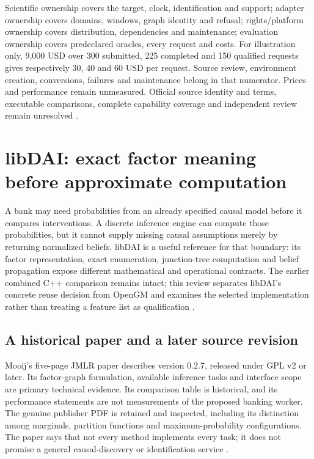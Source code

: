 Scientific ownership covers the target, clock, identification and support;
adapter ownership covers domains, windows, graph identity and refusal;
rights/platform ownership covers distribution, dependencies and maintenance;
evaluation ownership covers predeclared oracles, every request and costs.
For illustration only, 9,000 USD over 300 submitted, 225 completed and
150 qualified requests gives respectively 30, 40 and 60 USD per request.
Source review, environment creation, conversions, failures and maintenance
belong in that numerator. Prices and performance remain unmeasured.
Official source identity and terms, executable comparisons, complete capability coverage and independent review remain unresolved
\cite{exec24_banjo_choice}.


\section{libDAI: exact factor meaning before approximate computation}
\label{sec:exec24-libdai-reuse}

A bank may need probabilities from an already specified causal model before
it compares interventions. A discrete inference engine can compute those
probabilities, but it cannot supply missing causal assumptions merely by
returning normalized beliefs. libDAI is a useful reference for that boundary:
its factor representation, exact enumeration, junction-tree computation and
belief propagation expose different mathematical and operational contracts.
The earlier combined C++ comparison remains intact; this review separates
libDAI's concrete reuse decision from OpenGM and examines the selected
implementation rather than treating a feature list as qualification
\cite{exec13_cxx_inference,exec24_libdai_source}.

\subsection{A historical paper and a later source revision}
Mooij's five-page JMLR paper describes version 0.2.7, released under GPL v2 or
later. Its factor-graph formulation, available inference tasks and interface
scope are primary technical evidence. Its comparison table is historical,
and its performance statements are not measurements of the proposed banking
worker. The genuine publisher PDF is retained and inspected, including its
distinction among marginals, partition functions and maximum-probability
configurations. The paper says that not every method implements every task;
it does not promise a general causal-discovery or identification service
\cite{exec24_libdai_paper}.

